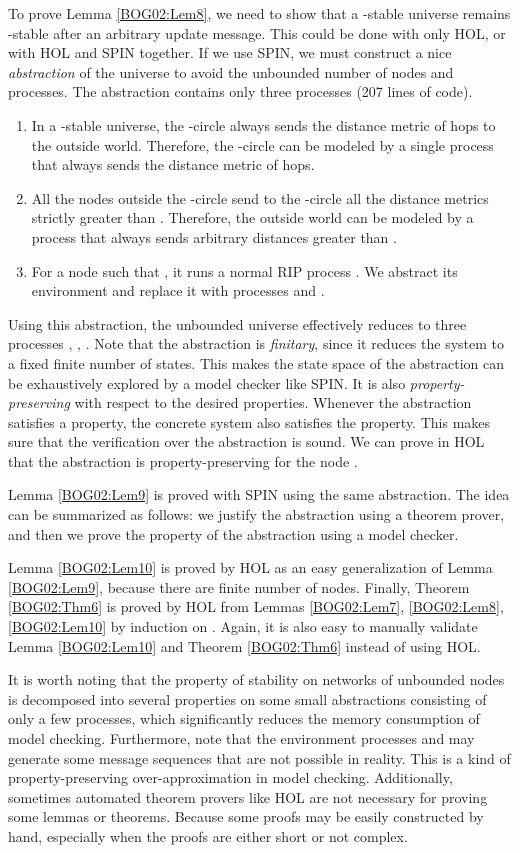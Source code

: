 \documentclass[a4paper,10pt,twocolumn]{article}
\begin{document}
To prove Lemma \ref{BOG02:Lem8}, we need to show that a -stable universe remains -stable after an arbitrary update message. This could be done with only HOL, or with HOL and SPIN together. If we use SPIN, we must construct a nice \emph{abstraction} of the universe to avoid the unbounded number of nodes and processes. The abstraction contains only three processes (207 lines of code).
\begin{enumerate}
  \item In a -stable universe, the -circle always sends the distance metric of  hops to the outside world. Therefore, the -circle can be modeled by a single process  that always sends the distance metric of  hops.
  \item All the nodes outside the -circle send to the -circle all the distance metrics strictly greater than . Therefore, the outside world can be modeled by a process  that always sends arbitrary distances greater than .
  \item For a node  such that , it runs a normal RIP process . We abstract its environment and replace it with processes  and .
\end{enumerate}
Using this abstraction, the unbounded universe  effectively reduces to three processes , , . Note that the abstraction is \emph{finitary}, since it reduces the system to a fixed finite number of states. This makes the state space of the abstraction can be exhaustively explored by a model checker like SPIN. It is also \emph{property-preserving} with respect to the desired properties. Whenever the abstraction satisfies a property, the concrete system also satisfies the property. This makes sure that the verification over the abstraction is sound. We can prove in HOL that the abstraction is property-preserving for the node .

Lemma \ref{BOG02:Lem9} is proved with SPIN using the same abstraction. The idea can be summarized as follows: we justify the abstraction using a theorem prover, and then we prove the property of the abstraction using a model checker.

Lemma \ref{BOG02:Lem10} is proved by HOL as an easy generalization of Lemma \ref{BOG02:Lem9}, because there are finite number of nodes. Finally, Theorem \ref{BOG02:Thm6} is proved by HOL from Lemmas \ref{BOG02:Lem7}, \ref{BOG02:Lem8}, \ref{BOG02:Lem10} by induction on . Again, it is also easy to manually validate Lemma \ref{BOG02:Lem10} and Theorem \ref{BOG02:Thm6} instead of using HOL.

It is worth noting that the property of stability on networks of unbounded nodes is decomposed into several properties on some small abstractions consisting of only a few processes, which significantly reduces the memory consumption of model checking. Furthermore, note that the environment processes  and  may generate some message sequences that are not possible in reality. This is a kind of property-preserving over-approximation in model checking. Additionally, sometimes automated theorem provers like HOL are not necessary for proving some lemmas or theorems. Because some proofs may be easily constructed by hand, especially when the proofs are either short or not complex.
\end{document}
